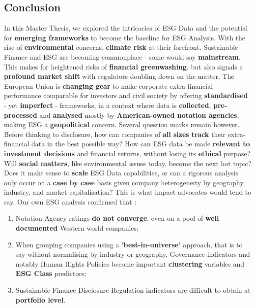\documentclass[12pt]{report}
\begin{document}
\begin{titlepage}
\section{Conclusion}
In this Master Thesis, we explored the intricacies of ESG Data and the potential for \textbf{emerging frameworks} to become the baseline for ESG Analysis.\newline
With the rise of \textbf{environmental} concerns, \textbf{climate risk} at their forefront, Sustainable Finance and ESG are becoming commonplace - some would say \textbf{mainstream}. This makes for heightened risks of \textbf{financial greenwashing}, but also signals a \textbf{ profound market shift} with regulators doubling down on the matter. The European Union is \textbf{changing gear} to make corporate extra-financial performance comparable for investors and civil society by offering  \textbf{standardised} - yet \textbf{imperfect} - frameworks, in a context where data is \textbf{collected}, \textbf{pre-processed} and \textbf{analysed} mostly by \textbf{American-owned notation agencies}, making ESG a \textbf{geopolitical} concern.\newline
Several question marks remain however. Before thinking to disclosure, how can companies of \textbf{all sizes} \textbf{track} their extra-financial data in the best possible way? How can ESG data be made \textbf{relevant to investment decisions} and financial returns, without losing its \textbf{ethical} purpose? Will \textbf{social matters}, like environmental issues today, become the next hot topic? Does it make sense to \textbf{scale} ESG Data capabilities, or can a rigorous analysis only occur on a \textbf{case by case} basis given company heterogeneity by geography, industry, and market capitalisation? This is what impact advocates would tend to say.\newline
Our own ESG analysis confirmed that :
\begin{enumerate}
    \item Notation Agency ratings \textbf{do not converge}, even on a pool of \textbf{well documented} Western world companies;
    \item When grouping companies using a \textbf{'best-in-universe'} approach, that is to say without normalising by industry or geography, Governance indicators and notably Human Rights Policies become important \textbf{clustering} variables and \textbf{ESG Class} predictors;
    \item Sustainable Finance Disclosure Regulation indicators are difficult to obtain at \textbf{portfolio level}.
\end{enumerate}


\end{titlepage}
\end{document}
